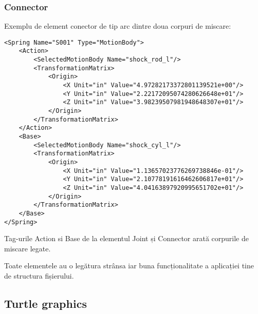 \subsubsection{Connector}
Exemplu de element conector de tip arc dintre doua corpuri de miscare:

\lstset{language=XML}
\begin{lstlisting}
<Spring Name="S001" Type="MotionBody">
    <Action>
        <SelectedMotionBody Name="shock_rod_l"/>
        <TransformationMatrix>
            <Origin>
                <X Unit="in" Value="4.97282173372801139521e+00"/>
                <Y Unit="in" Value="2.22172095074280626648e+01"/>
                <Z Unit="in" Value="3.98239507981948648307e+01"/>
            </Origin>
        </TransformationMatrix>
    </Action>
    <Base>
        <SelectedMotionBody Name="shock_cyl_l"/>
        <TransformationMatrix>
            <Origin>
                <X Unit="in" Value="1.13657023776269738846e-01"/>
                <Y Unit="in" Value="2.10778191616462606817e+01"/>
                <Z Unit="in" Value="4.04163897920995651702e+01"/>
            </Origin>
        </TransformationMatrix>
    </Base>
</Spring>
\end{lstlisting}

Tag-urile Action si Base de la elementul Joint și Connector arată corpurile de miscare legate.

Toate elementele au o legătura strânsa iar buna funcționalitate a aplicației tine de structura fișierului.

\subsection{Turtle graphics}
